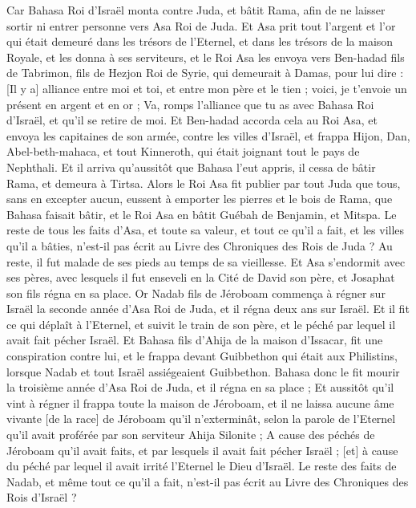 \begin{multicols}{2}
Car Bahasa Roi d'Israël monta contre Juda, et bâtit Rama, afin de ne laisser sortir ni entrer personne vers Asa Roi de Juda.
Et Asa prit tout l'argent et l'or qui était demeuré dans les trésors de l'Eternel, et dans les trésors de la maison Royale, et les donna à ses serviteurs, et le Roi Asa les envoya vers Ben-hadad fils de Tabrimon, fils de Hezjon Roi de Syrie, qui demeurait à Damas, pour lui dire :
[Il y a] alliance entre moi et toi, et entre mon père et le tien ; voici, je t'envoie un présent en argent et en or ; Va, romps l'alliance que tu as avec Bahasa Roi d'Israël, et qu'il se retire de moi.
Et Ben-hadad accorda cela au Roi Asa, et envoya les capitaines de son armée, contre les villes d'Israël, et frappa Hijon, Dan, Abel-beth-mahaca, et tout Kinneroth, qui était joignant tout le pays de Nephthali.
Et il arriva qu'aussitôt que Bahasa l'eut appris, il cessa de bâtir Rama, et demeura à Tirtsa.
Alors le Roi Asa fit publier par tout Juda que tous, sans en excepter aucun, eussent à emporter les pierres et le bois de Rama, que Bahasa faisait bâtir, et le Roi Asa en bâtit Guébah de Benjamin, et Mitspa.
Le reste de tous les faits d'Asa, et toute sa valeur, et tout ce qu'il a fait, et les villes qu'il a bâties, n'est-il pas écrit au Livre des Chroniques des Rois de Juda ? Au reste, il fut malade de ses pieds au temps de sa vieillesse.
Et Asa s'endormit avec ses pères, avec lesquels il fut enseveli en la Cité de David son père, et Josaphat son fils régna en sa place.
Or Nadab fils de Jéroboam commença à régner sur Israël la seconde année d'Asa Roi de Juda, et il régna deux ans sur Israël.
Et il fit ce qui déplaît à l'Eternel, et suivit le train de son père, et le péché par lequel il avait fait pécher Israël.
Et Bahasa fils d'Ahija de la maison d'Issacar, fit une conspiration contre lui, et le frappa devant Guibbethon qui était aux Philistins, lorsque Nadab et tout Israël assiégeaient Guibbethon.
Bahasa donc le fit mourir la troisième année d'Asa Roi de Juda, et il régna en sa place ;
Et aussitôt qu'il vint à régner il frappa toute la maison de Jéroboam, et il ne laissa aucune âme vivante [de la race] de Jéroboam qu'il n'exterminât, selon la parole de l'Eternel qu'il avait proférée par son serviteur Ahija Silonite ;
A cause des péchés de Jéroboam qu'il avait faits, et par lesquels il avait fait pécher Israël ; [et] à cause du péché par lequel il avait irrité l'Eternel le Dieu d'Israël.
Le reste des faits de Nadab, et même tout ce qu'il a fait, n'est-il pas écrit au Livre des Chroniques des Rois d'Israël ?

\end{multicols}
